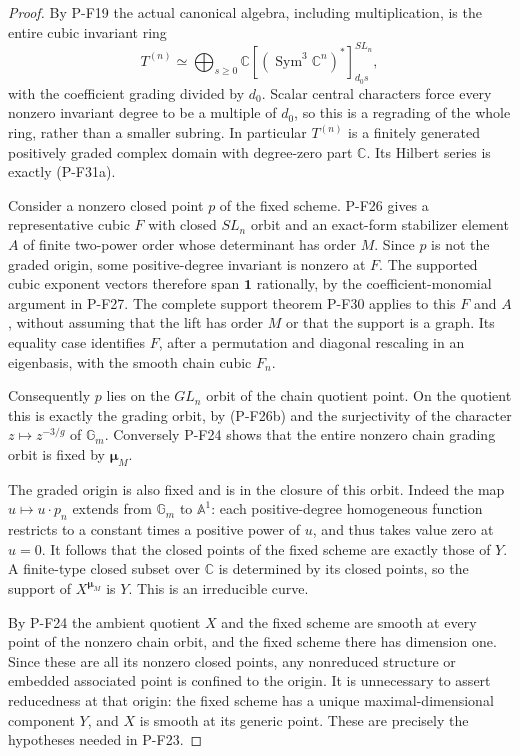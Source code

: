 \begin{proof}
By P-F19 the actual canonical algebra, including multiplication,
is the entire cubic invariant ring
\[
 T^{(n)}\simeq
   \bigoplus_{s\ge0}
      \mathbb C[(\operatorname{Sym}^3\mathbb C^n)^*]^{SL_n}_{d_0s},
 \tag{P-F31e}
\]
with the coefficient grading divided by $d_0$. Scalar central
characters force every nonzero invariant degree to be a multiple
of $d_0$, so this is a regrading of the whole ring, rather than
a smaller subring. In particular $T^{(n)}$ is a finitely generated
positively graded complex domain with degree-zero part $\mathbb C$.
Its Hilbert series is exactly (P-F31a).

Consider a nonzero closed point $p$ of the fixed scheme.
P-F26 gives a representative cubic $F$ with closed $SL_n$ orbit
and an exact-form stabilizer element $A$ of finite two-power order
whose determinant has order $M$. Since $p$ is not the graded
origin, some positive-degree invariant is nonzero at $F$.
The supported cubic exponent vectors therefore span
$\mathbf1$ rationally, by the coefficient-monomial argument
in P-F27. The complete support theorem P-F30 applies to this
$F$ and $A$, without assuming that the lift has order $M$
or that the support is a graph. Its equality case identifies
$F$, after a permutation and diagonal rescaling in an eigenbasis,
with the smooth chain cubic $F_n$.

Consequently $p$ lies on the $GL_n$ orbit of the chain quotient
point. On the quotient this is exactly the grading orbit, by
(P-F26b) and the surjectivity of the character
$z\mapsto z^{-3/g}$ of $\mathbb G_m$. Conversely P-F24 shows
that the entire nonzero chain grading orbit is fixed by
$\boldsymbol\mu_M$.

The graded origin is also fixed and is in the closure of this
orbit. Indeed the map $u\mapsto u\cdot p_n$ extends from
$\mathbb G_m$ to $\mathbb A^1$: each positive-degree homogeneous
function restricts to a constant times a positive power of $u$,
and thus takes value zero at $u=0$. It follows that the closed
points of the fixed scheme are exactly those of $Y$. A
finite-type closed subset over $\mathbb C$ is determined by
its closed points, so the support of $X^{\boldsymbol\mu_M}$
is $Y$. This is an irreducible curve.

By P-F24 the ambient quotient $X$ and the fixed scheme are
smooth at every point of the nonzero chain orbit, and the fixed
scheme there has dimension one. Since these are all its
nonzero closed points, any nonreduced structure or embedded
associated point is confined to the origin. It is unnecessary
to assert reducedness at that origin: the fixed scheme has a
unique maximal-dimensional component $Y$, and $X$ is smooth
at its generic point. These are precisely the hypotheses
needed in P-F23.


\end{proof}
